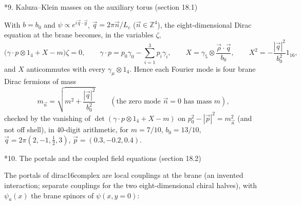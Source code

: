 \documentclass[10pt,a4paper]{article}
\makeatletter
\renewcommand\section{\@startsection{section}{1}{\z@}{-3.5ex \@plus -1ex \@minus -.2ex}{2.3ex \@plus.2ex}{\normalfont\Large\bfseries\raggedright}}
\makeatother
\begin{document}
\section*{9. Kaluza–Klein masses on the auxiliary torus (section 18.1)}
With $b=b_0$ and $\psi\propto e^{i\vec q\cdot\vec y}$, $\vec q=2\pi\vec n/L_c$ ($\vec n\in\mathbb Z^4$), the eight-dimensional Dirac equation at the brane becomes, in the variables $\zeta$,
\begin{equation*}
\big(\gamma\cdot p\otimes1_4+X-m\big)\zeta=0,\qquad \gamma\cdot p=p_0\gamma_0-\sum_{i=1}^3p_i\gamma_i,\qquad X=\gamma_5\otimes\frac{\vec\rho\cdot\vec q}{b_0},\qquad X^2=-\frac{|\vec q|^2}{b_0^2}1_{16},
\end{equation*}
and $X$ anticommutes with every $\gamma_\mu\otimes1_4$. Hence each Fourier mode is four brane Dirac fermions of mass
\begin{equation*}
m_{\vec n}=\sqrt{m^2+\frac{|\vec q|^2}{b_0^2}}\qquad(\text{the zero mode }\vec n=0\text{ has mass }m),
\end{equation*}
checked by the vanishing of $\det(\gamma\cdot p\otimes1_4+X-m)$ on $p_0^2-|\vec p|^2=m_{\vec n}^2$ (and not off shell), in 40-digit arithmetic, for $m=7/10$, $b_0=13/10$, $\vec q=2\pi(2,-1,\frac12,3)$, $\vec p=(0.3,-0.2,0.4)$.

\section*{10. The portals and the coupled field equations (section 18.2)}
The portals of dirac16complex are local couplings at the brane (an invented interaction; separate couplings for the two eight-dimensional chiral halves), with $\psi_a(x)$ the brane spinors of $\psi(x,y=0)$:
\end{document}
